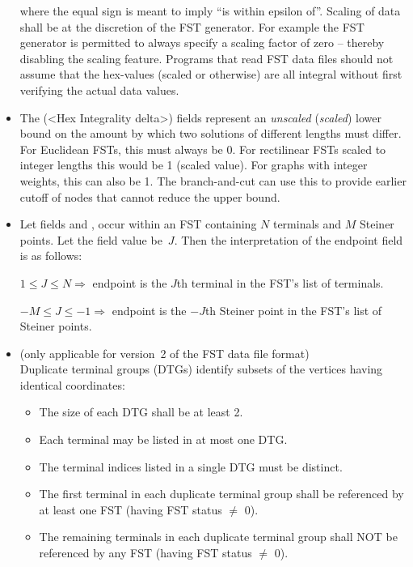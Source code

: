 \documentclass[12pt,twoside,letterpaper]{article}
\def\code#1{{\ttfamily #1}}
\begin{document}
\begin{itemize}
  where the equal sign is meant to imply ``is within epsilon of''.
  Scaling of data shall be at the discretion of the FST generator.  For
  example the FST generator is permitted to always specify a scaling
  factor of zero -- thereby disabling the scaling feature.  Programs
  that read FST data files should not assume that the hex-values (scaled
  or otherwise) are all integral without first verifying the actual data
  values.

\item
  The \code{<Decimal Integrality delta>} (\code{<Hex Integrality
    delta>}) fields represent an {\em unscaled} ({\em scaled}) lower bound on the
  amount by which two solutions of different lengths must differ.  For
  Euclidean FSTs, this must always be 0.  For rectilinear FSTs scaled
  to integer lengths this would be 1 (scaled value).  For graphs with
  integer weights, this can also be 1.  The branch-and-cut can use
  this to provide earlier cutoff of nodes that cannot reduce the upper
  bound.

\item 
  Let fields \code{<endpoint-1>} and \code{<endpoint-2>}, occur within an FST
  containing $N$ terminals and $M$ Steiner points.  Let the field
  value be~$J$.  Then the interpretation of the endpoint field is as
  follows: 

        $1 \le J \le N \Longrightarrow$ endpoint is the $J$th terminal
                            in the FST's list of terminals.

        $-M \le J \le -1 \Longrightarrow$ endpoint is the $-J$th
                            Steiner point in the FST's list of Steiner
                            points.

\item (only applicable for version~2 of the FST data file format)\\
  Duplicate terminal groups (DTGs) identify subsets of the vertices
  having identical coordinates:
  \begin{itemize}
  \item The size of each DTG shall be at least 2.
  \item Each terminal may be listed in at most one DTG.
  \item The terminal indices listed in a single DTG must be distinct.
  \item The first terminal in each duplicate terminal group shall be
    referenced by at least one FST (having FST status $\ne$ 0).
  \item The remaining terminals in each duplicate terminal group shall NOT
      be referenced by any FST (having FST status $\ne$ 0).
    \end{itemize}
    

\end{itemize}
\end{document}
